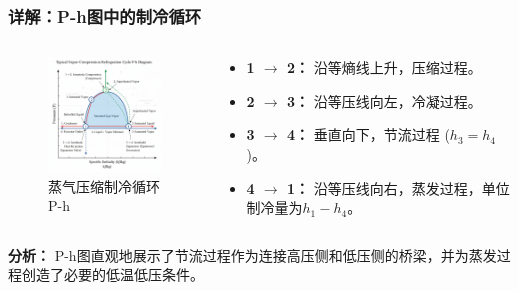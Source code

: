 \documentclass{beamer}
\begin{document}
\begin{frame}
    \frametitle{详解：P-h图中的制冷循环}
    \begin{columns}
        \begin{column}{0.5\textwidth}
           \begin{figure}
             \centering
             \includegraphics[width=5cm]{image copy.png}
             \caption{蒸气压缩制冷循环P-h}
           \end{figure}
        \end{column}
        \begin{column}{0.5\textwidth}
          \begin{itemize}
              \item \textbf{1 $\rightarrow$ 2：} 沿等熵线上升，\alert{压缩过程}。
              \item \textbf{2 $\rightarrow$ 3：} 沿等压线向左，\alert{冷凝过程}。
              \item \textbf{3 $\rightarrow$ 4：} 垂直向下，\alert{节流过程} ($h_3 = h_4$)。
              \item \textbf{4 $\rightarrow$ 1：} 沿等压线向右，\alert{蒸发过程}，单位制冷量为$h_1 - h_4$。
          \end{itemize}
        \end{column}
    \end{columns}
    \vfill
    \textbf{分析：} P-h图直观地展示了节流过程作为连接高压侧和低压侧的桥梁，并为蒸发过程创造了必要的低温低压条件。
\end{frame}
\end{document}
